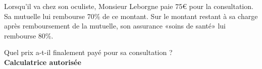 %
%
	Lorsqu’il va chez son oculiste, Monsieur Leborgne paie 75€ pour la consultation. Sa mutuelle lui rembourse 70\% de ce montant. Sur le montant restant à sa charge après remboursement de la mutuelle, son assurance «soins de santé» lui rembourse 80\%.

Quel prix a-t-il finalement payé pour sa consultation ? \\
\textbf{Calculatrice autorisée}
